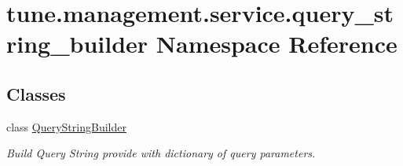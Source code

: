 \hypertarget{namespacetune_1_1management_1_1service_1_1query__string__builder}{\section{tune.\-management.\-service.\-query\-\_\-string\-\_\-builder Namespace Reference}
\label{namespacetune_1_1management_1_1service_1_1query__string__builder}
}
\subsection*{Classes}
\begin{DoxyCompactItemize}
\item 
class \hyperlink{classtune_1_1management_1_1service_1_1query__string__builder_1_1QueryStringBuilder}{Query\-String\-Builder}
\begin{DoxyCompactList}\small\item\em Build Query String provide with dictionary of query parameters. \end{DoxyCompactList}\end{DoxyCompactItemize}
